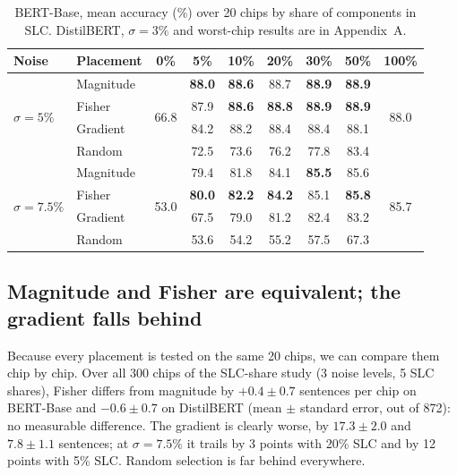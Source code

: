 \documentclass[10pt,a4paper]{article}
\newcommand{\best}[1]{\textcolor{cmag}{\textbf{#1}}}
\begin{document}
\begin{table}[h]
\centering\small
\begin{tabular}{@{}llccccccc@{}}
\toprule
Noise & Placement & 0\% & 5\% & 10\% & 20\% & 30\% & 50\% & 100\% \\
\midrule
\multirow{4}{*}{$\sigma=5\%$}
 & Magnitude & \multirow{4}{*}{66.8} & \best{88.0} & \best{88.6} & 88.7 & \best{88.9} & \best{88.9} & \multirow{4}{*}{88.0} \\
 & Fisher    & & 87.9 & \best{88.6} & \best{88.8} & \best{88.9} & \best{88.9} & \\
 & Gradient  & & 84.2 & 88.2 & 88.4 & 88.4 & 88.1 & \\
 & Random    & & 72.5 & 73.6 & 76.2 & 77.8 & 83.4 & \\
\midrule
\multirow{4}{*}{$\sigma=7.5\%$}
 & Magnitude & \multirow{4}{*}{53.0} & 79.4 & 81.8 & 84.1 & \best{85.5} & 85.6 & \multirow{4}{*}{85.7} \\
 & Fisher    & & \best{80.0} & \best{82.2} & \best{84.2} & 85.1 & \best{85.8} & \\
 & Gradient  & & 67.5 & 79.0 & 81.2 & 82.4 & 83.2 & \\
 & Random    & & 53.6 & 54.2 & 55.2 & 57.5 & 67.3 & \\
\bottomrule
\end{tabular}
\caption{BERT-Base, mean accuracy (\%) over 20 chips by share of components in SLC. DistilBERT,
$\sigma=3\%$ and worst-chip results are in Appendix~A.}
\end{table}

\subsection{Magnitude and Fisher are equivalent; the gradient falls behind}
Because every placement is tested on the same 20 chips, we can compare them chip by chip. Over all 300
chips of the SLC-share study (3 noise levels, 5 SLC shares), Fisher differs from magnitude by
$+0.4\pm0.7$ sentences per chip on BERT-Base and $-0.6\pm0.7$ on DistilBERT (mean $\pm$ standard error,
out of 872): no measurable difference. The gradient is clearly worse, by $17.3\pm2.0$ and $7.8\pm1.1$
sentences; at $\sigma=7.5\%$ it trails by 3 points with 20\% SLC and by 12 points with 5\% SLC. Random selection is far behind everywhere.
\end{document}
